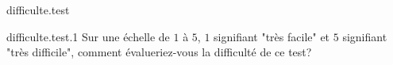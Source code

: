 \begin{qcm}{difficulte.test}
    \begin{questionmult}{difficulte.test.1}
        Sur une échelle de \(1\) à \(5\), \(1\) signifiant "très facile" et \(5\) signifiant "très difficile", comment évalueriez-vous la difficulté de ce test?       
        {\footnotesize {}\QuestionIndicative
        }
    \end{questionmult}
\end{qcm}
